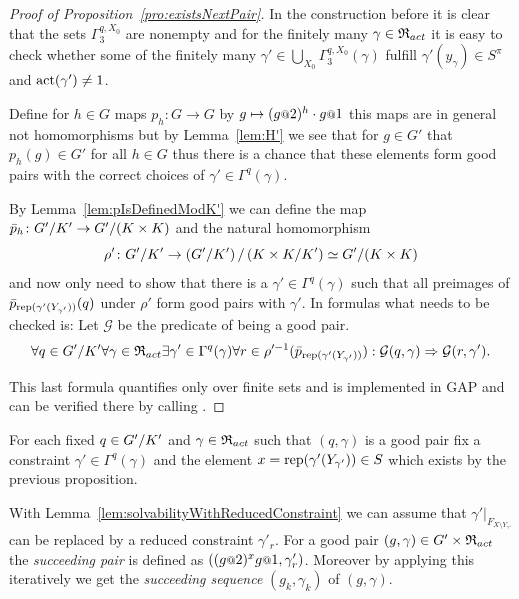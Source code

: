 \documentclass[a4paper,11pt]{amsart}
\begin{document}
\begin{proof}[Proof of Proposition~\ref{pro:existsNextPair}]
 In the construction before it is clear that the sets $\Gamma_3^{q,X_0}$ are nonempty and for the finitely many $\gamma\in \mathfrak{R}_{act}$ it is
 easy to check whether some of the finitely many $\gamma'\in\bigcup_{X_0}\Gamma_3^{q,X_0}(\gamma)$ fulfill $\gamma'(y_\gamma) \in S^\pi$ and $\operatorname{act}(\gamma')\neq 1$.
 
 
  Define for $h\in G$ maps $p_h\colon G\to G$ by $g\mapsto (g\at{2})^{h}\cdot g\at{1}$ this maps are in general not homomorphisms but 
  by Lemma~\ref{lem:H'} 
  we see that for $g\in G'$ that $p_h(g)\in G'$ for all $h\in G$ thus there is a chance that these elements form good pairs with
  the correct choices of $\gamma' \in \Gamma^q(\gamma)$. 
 
  By Lemma~\ref{lem:pIsDefinedModK'} we can define the map $\bar p_h\colon {G'/K'} \to {G'/(K\times K)}$
 and the natural homomorphism \[\rho'\colon {G'/K'} \to {\left({G'/K'}\right)/\left({K\times K/K'}\right)} \simeq {G'/(K\times K)} \]
 and now only need to show that there is a $\gamma'\in\Gamma^q(\gamma)$ such that all preimages of $\bar p_{\textup{rep}(\gamma'(Y_{\gamma'}))}(q)$ under $\rho'$ 
 form good pairs with $\gamma'$. In formulas what needs to be checked is: Let $\mathcal{G}$ be the predicate of being a good pair. 
 \[\forall q\in{G'/K'}
      \forall \gamma\in\mathfrak{R}_{act} 
	 \exists \gamma'\in \Gamma^q(\gamma)
	    \forall r\in \rho'^{-1}(\bar p_{\textup{rep}(\gamma'(Y_{\gamma'}))}):
	      \mathcal{G}(q,\gamma) \Rightarrow \mathcal{G}(r,\gamma').\]
 
 This last formula quantifies only over finite sets and is implemented in GAP and can be verified there by calling . 
 \end{proof}

 \begin{defi}
 For each fixed $q\in{G'/K'}$ and $\gamma\in \mathfrak{R}_{act}$ such that $(q,\gamma)$ is a good pair
 fix a constraint $\gamma'\in\Gamma^q(\gamma)$ and the element $x=\textup{rep}(\gamma'(Y_{\gamma'}))\in S$ which exists by the previous proposition.
 
 With Lemma~\ref{lem:solvabilityWithReducedConstraint} we can assume that $\gamma'|_{F_{X\setminus Y_{\gamma'}}}$ can be replaced by a reduced constraint $\gamma'_r$. 
 For a good pair $(g,\gamma)\in G'\times\mathfrak{R}_{act}$ the \emph{succeeding pair} is defined as $\left((g\at{2})^xg\at{1},\gamma'_r\right)$.
 Moreover by applying this iteratively we get the \emph{succeeding sequence} $(g_k,\gamma_k)$ of $(g,\gamma)$.
 \end{defi}
 
\end{document}
